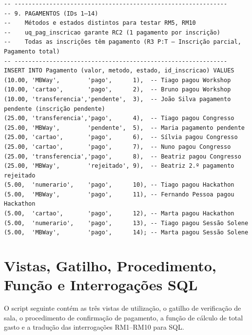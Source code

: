 \documentclass[runningheads]{llncs}
\begin{document}
\begin{small}
\begin{verbatim}
-- -------------------------------------------------------------
-- 9. PAGAMENTOS (IDs 1–14)
--    Métodos e estados distintos para testar RM5, RM10
--    uq_pag_inscricao garante RC2 (1 pagamento por inscrição)
--    Todas as inscrições têm pagamento (R3 P:T — Inscrição parcial, Pagamento total)
-- -------------------------------------------------------------
INSERT INTO Pagamento (valor, metodo, estado, id_inscricao) VALUES
(10.00, 'MBWay',        'pago',      1),  -- Tiago pagou Workshop
(10.00, 'cartao',       'pago',      2),  -- Bruno pagou Workshop
(10.00, 'transferencia','pendente',  3),  -- João Silva pagamento pendente (inscrição pendente)
(25.00, 'transferencia','pago',      4),  -- Tiago pagou Congresso
(25.00, 'MBWay',        'pendente',  5),  -- Maria pagamento pendente
(25.00, 'cartao',       'pago',      6),  -- Sílvia pagou Congresso
(25.00, 'cartao',       'pago',      7),  -- Nuno pagou Congresso
(25.00, 'transferencia','pago',      8),  -- Beatriz pagou Congresso
(25.00, 'MBWay',        'rejeitado', 9),  -- Beatriz 2.º pagamento rejeitado
(5.00,  'numerario',    'pago',      10), -- Tiago pagou Hackathon
(5.00,  'MBWay',        'pago',      11), -- Fernando Pessoa pagou Hackathon
(5.00,  'cartao',       'pago',      12), -- Marta pagou Hackathon
(5.00,  'numerario',    'pago',      13), -- Tiago pagou Sessão Solene
(5.00,  'MBWay',        'pago',      14); -- Marta pagou Sessão Solene

\end{verbatim}
\end{small}

\newpage
\section{Vistas, Gatilho, Procedimento, Função e Interrogações SQL}
\label{apx:queries}

O script seguinte contém as três vistas de utilização, o gatilho de
verificação de sala, o procedimento de confirmação de pagamento, a função
de cálculo de total gasto e a tradução das interrogações RM1--RM10 para SQL.
\end{document}
